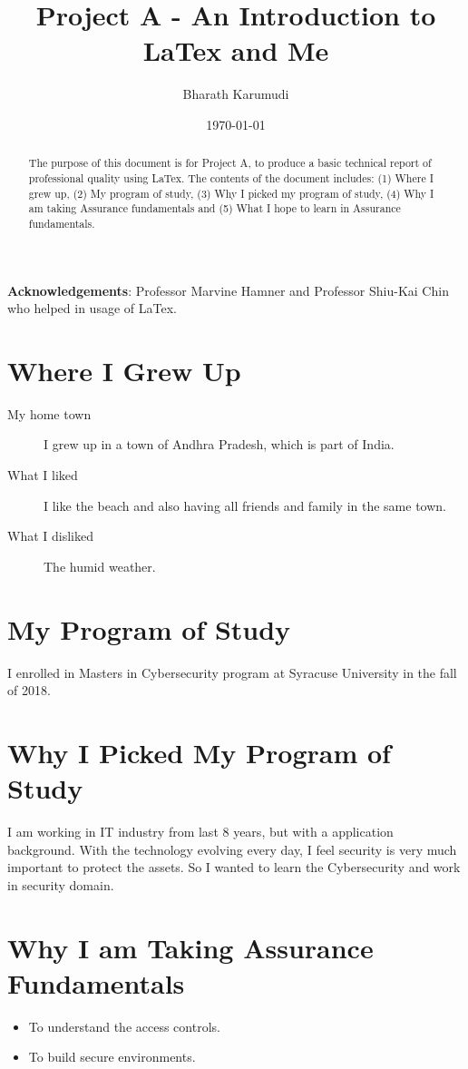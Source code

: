 \documentclass{article}
\title{Project A - An Introduction to LaTex and Me}
\author{Bharath Karumudi}
\date{\today}
\begin{document}
\maketitle{}

\begin{abstract}
  The purpose of this document is for Project A, to produce a basic
  technical report of professional quality using LaTex. The contents
  of the document includes: (1) Where I grew up, (2) My program of
  study, (3) Why I picked my program of study, (4) Why I am taking
  Assurance fundamentals and (5) What I hope to learn in Assurance
  fundamentals.

\end{abstract}

\textbf{Acknowledgements}: Professor Marvine Hamner and Professor Shiu-Kai Chin who helped in usage of LaTex.

\section{Where I Grew Up}
\label{sec:where-i-grew}

\begin{description}
\item[My home town] I grew up in a town of Andhra Pradesh, which is part of India.
\item[What I liked] I like the beach and also having all friends and family in the same town.
\item[What I disliked] The humid weather.

\end{description}

\section{My Program of Study}
\label{sec:my-program-study}
I enrolled in Masters in Cybersecurity program at Syracuse University in the fall of 2018.

\section{Why I Picked My Program of Study}
\label{sec:why-i-picked}
I am working in IT industry from last 8 years, but with a application background. With the technology evolving every day, I feel security is very much important to protect the assets. So I wanted to learn the Cybersecurity and work in security domain.

\section{Why I am Taking Assurance Fundamentals}
\label{sec:why-i-am}
\begin{itemize}
\item To understand the access controls.
\item To build secure environments.
\end{itemize}
\end{document}

